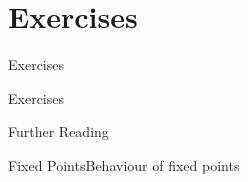 \documentclass[12pt,aspectratio=169]{beamer}
\begin{document}
\section{Exercises}
\begin{frame}{Exercises}
\end{frame}

\begin{frame}{Exercises}
\end{frame}


\begin{frame}{Further Reading}
  \nocite{burden2015numerical,hamming1986numerical,isaacson1994analysis,suli2003introduction,gerald2004applied,atkinson1993elementary}
  \printbibliography
\end{frame}

\appendix
\begin{frame}{Fixed Points}{Behaviour of fixed points}
\end{frame}
\end{document}
